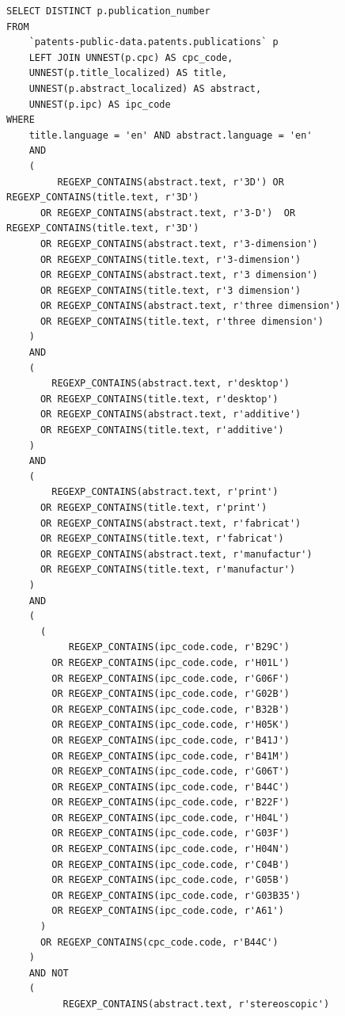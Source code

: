 \begin{verbatim}
SELECT DISTINCT p.publication_number            
FROM
    `patents-public-data.patents.publications` p
    LEFT JOIN UNNEST(p.cpc) AS cpc_code,
    UNNEST(p.title_localized) AS title,
    UNNEST(p.abstract_localized) AS abstract,
    UNNEST(p.ipc) AS ipc_code              
WHERE
    title.language = 'en' AND abstract.language = 'en'
    AND 
    (
         REGEXP_CONTAINS(abstract.text, r'3D') OR REGEXP_CONTAINS(title.text, r'3D')
      OR REGEXP_CONTAINS(abstract.text, r'3-D')  OR REGEXP_CONTAINS(title.text, r'3D')
      OR REGEXP_CONTAINS(abstract.text, r'3-dimension') 
      OR REGEXP_CONTAINS(title.text, r'3-dimension')
      OR REGEXP_CONTAINS(abstract.text, r'3 dimension') 
      OR REGEXP_CONTAINS(title.text, r'3 dimension')
      OR REGEXP_CONTAINS(abstract.text, r'three dimension') 
      OR REGEXP_CONTAINS(title.text, r'three dimension')                
    )
    AND 
    (
        REGEXP_CONTAINS(abstract.text, r'desktop') 
      OR REGEXP_CONTAINS(title.text, r'desktop')
      OR REGEXP_CONTAINS(abstract.text, r'additive') 
      OR REGEXP_CONTAINS(title.text, r'additive')
    )
    AND 
    (
        REGEXP_CONTAINS(abstract.text, r'print') 
      OR REGEXP_CONTAINS(title.text, r'print')
      OR REGEXP_CONTAINS(abstract.text, r'fabricat') 
      OR REGEXP_CONTAINS(title.text, r'fabricat')
      OR REGEXP_CONTAINS(abstract.text, r'manufactur') 
      OR REGEXP_CONTAINS(title.text, r'manufactur')
    )                
    AND 
    (
      (
           REGEXP_CONTAINS(ipc_code.code, r'B29C') 
        OR REGEXP_CONTAINS(ipc_code.code, r'H01L') 
        OR REGEXP_CONTAINS(ipc_code.code, r'G06F')
        OR REGEXP_CONTAINS(ipc_code.code, r'G02B') 
        OR REGEXP_CONTAINS(ipc_code.code, r'B32B') 
        OR REGEXP_CONTAINS(ipc_code.code, r'H05K')
        OR REGEXP_CONTAINS(ipc_code.code, r'B41J') 
        OR REGEXP_CONTAINS(ipc_code.code, r'B41M') 
        OR REGEXP_CONTAINS(ipc_code.code, r'G06T')
        OR REGEXP_CONTAINS(ipc_code.code, r'B44C') 
        OR REGEXP_CONTAINS(ipc_code.code, r'B22F') 
        OR REGEXP_CONTAINS(ipc_code.code, r'H04L')
        OR REGEXP_CONTAINS(ipc_code.code, r'G03F') 
        OR REGEXP_CONTAINS(ipc_code.code, r'H04N') 
        OR REGEXP_CONTAINS(ipc_code.code, r'C04B')
        OR REGEXP_CONTAINS(ipc_code.code, r'G05B') 
        OR REGEXP_CONTAINS(ipc_code.code, r'G03B35') 
        OR REGEXP_CONTAINS(ipc_code.code, r'A61')
      )
      OR REGEXP_CONTAINS(cpc_code.code, r'B44C')      
    )
    AND NOT 
    (
          REGEXP_CONTAINS(abstract.text, r'stereoscopic') 

\end{verbatim}

